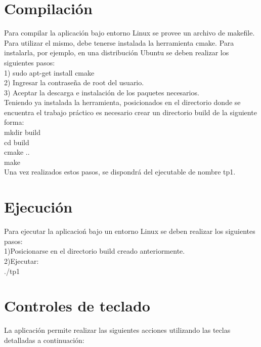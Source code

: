 \documentclass[11pt]{article}
\begin{document}
\section{Compilaci\'on}
  Para compilar la aplicaci\'on bajo entorno Linux se provee un archivo de makefile.
  Para utilizar el mismo, debe tenerse instalada la herramienta cmake. Para instalarla, por ejemplo, en una distribuci\'on Ubuntu se deben 
realizar los siguientes pasos: \\
1) sudo apt-get install cmake \\
2) Ingresar la contrase\~na de root del usuario. \\
3) Aceptar la descarga e instalaci\'on de los paquetes necesarios. \\ 

Teniendo ya instalada la herramienta, posicionados en el directorio donde se encuentra el trabajo pr\'actico es necesario crear un directorio build
de la siguiente forma: \\
mkdir build \\
cd build \\
cmake .. \\
make \\

Una vez realizados estos pasos, se dispondr\'a del ejecutable de nombre tp1.

\section{Ejecuci\'on}

Para ejecutar la aplicacio\'n bajo un entorno Linux se deben realizar los siguientes pasos: \\
1)Posicionarse en el directorio build creado anteriormente. \\
2)Ejecutar: \\
./tp1 


\section{Controles de teclado}

La aplicaci\'on permite realizar las siguientes acciones utilizando las teclas detalladas a continuaci\'on: \\
\end{document}
